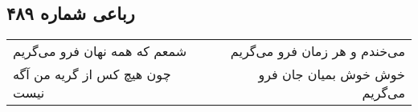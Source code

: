 \begin{center}
\section*{رباعی شماره ۴۸۹}
\label{sec:sh489}
\begin{longtable}{l p{0.5cm} r}
شمعم که همه نهان فرو می‌گریم
&&
می‌خندم و هر زمان فرو می‌گریم
\\
چون هیچ کس از گریه من آگه نیست
&&
خوش خوش بمیان جان فرو می‌گریم
\\
\end{longtable}
\end{center}
